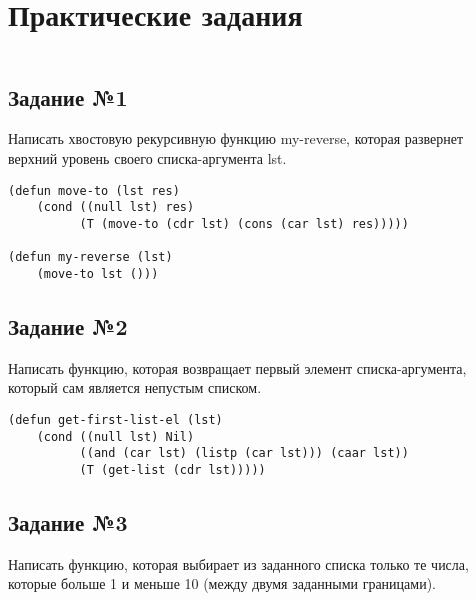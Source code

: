 \chapter{Практические задания}

\vspace{4mm}
\hfill
\begin{minipage}{0.92\linewidth}
\begin{lstlisting}
\end{lstlisting}
\end{minipage}

\section{Задание №1}

Написать хвостовую рекурсивную функцию my-reverse, которая развернет верхний
уровень своего списка-аргумента lst.

\vspace{4mm}
\hfill
\begin{minipage}{0.92\linewidth}
\begin{lstlisting}
(defun move-to (lst res)
    (cond ((null lst) res)
          (T (move-to (cdr lst) (cons (car lst) res)))))

(defun my-reverse (lst)
    (move-to lst ()))
\end{lstlisting}
\end{minipage}

\section{Задание №2}

Написать функцию, которая возвращает первый элемент списка-аргумента, который
сам является непустым списком.

\vspace{4mm}
\begin{minipage}{0.92\linewidth}
\begin{lstlisting}
(defun get-first-list-el (lst)
    (cond ((null lst) Nil)
          ((and (car lst) (listp (car lst))) (caar lst))
          (T (get-list (cdr lst)))))
\end{lstlisting}
\end{minipage}

\section{Задание №3}

Написать функцию, которая выбирает из заданного списка только те числа,
которые больше 1 и меньше 10 (между двумя заданными границами).

